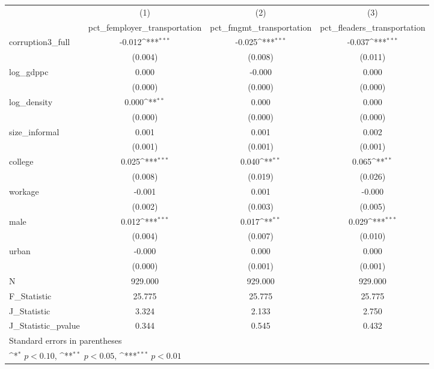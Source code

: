 {
\def\sym#1{\ifmmode^{#1}\else\(^{#1}\)\fi}
\begin{tabular}{l*{3}{c}}
\hline\hline
            &\multicolumn{1}{c}{(1)}&\multicolumn{1}{c}{(2)}&\multicolumn{1}{c}{(3)}\\
            &\multicolumn{1}{c}{pct\_femployer\_transportation}&\multicolumn{1}{c}{pct\_fmgmt\_transportation}&\multicolumn{1}{c}{pct\_fleaders\_transportation}\\
\hline
corruption3\_full&      -0.012\sym{***}&      -0.025\sym{***}&      -0.037\sym{***}\\
            &     (0.004)         &     (0.008)         &     (0.011)         \\
[1em]
log\_gdppc   &       0.000         &      -0.000         &       0.000         \\
            &     (0.000)         &     (0.000)         &     (0.000)         \\
[1em]
log\_density &       0.000\sym{**} &       0.000         &       0.000         \\
            &     (0.000)         &     (0.000)         &     (0.000)         \\
[1em]
size\_informal&       0.001         &       0.001         &       0.002         \\
            &     (0.001)         &     (0.001)         &     (0.001)         \\
[1em]
college     &       0.025\sym{***}&       0.040\sym{**} &       0.065\sym{**} \\
            &     (0.008)         &     (0.019)         &     (0.026)         \\
[1em]
workage     &      -0.001         &       0.001         &      -0.000         \\
            &     (0.002)         &     (0.003)         &     (0.005)         \\
[1em]
male        &       0.012\sym{***}&       0.017\sym{**} &       0.029\sym{***}\\
            &     (0.004)         &     (0.007)         &     (0.010)         \\
[1em]
urban       &      -0.000         &       0.000         &       0.000         \\
            &     (0.000)         &     (0.001)         &     (0.001)         \\
\hline
N           &     929.000         &     929.000         &     929.000         \\
F\_Statistic &      25.775         &      25.775         &      25.775         \\
J\_Statistic &       3.324         &       2.133         &       2.750         \\
J\_Statistic\_pvalue&       0.344         &       0.545         &       0.432         \\
\hline\hline
\multicolumn{4}{l}{\footnotesize Standard errors in parentheses}\\
\multicolumn{4}{l}{\footnotesize \sym{*} \(p<0.10\), \sym{**} \(p<0.05\), \sym{***} \(p<0.01\)}\\
\end{tabular}
}
